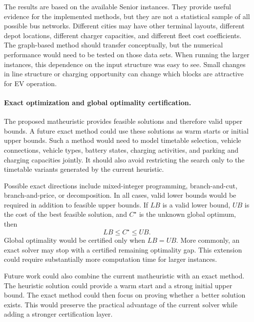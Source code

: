 The results are based on the available Senior instances.  They provide useful
evidence for the implemented methods, but they are not a statistical sample of
all possible bus networks.  Different cities may have other terminal layouts,
different depot locations, different charger capacities, and different fleet
cost coefficients.  The graph-based method should transfer conceptually, but
the numerical performance would need to be tested on those data sets.
When running the larger instances, this dependence on the input structure was
easy to see.  Small changes in line structure or charging opportunity can
change which blocks are attractive for EV operation.

\paragraph{Exact optimization and global optimality certification.}
\label{sec:future-global-optimality}

The proposed matheuristic provides feasible solutions and therefore valid upper
bounds.  A future exact method could use these solutions as warm starts or
initial upper bounds.  Such a method would need to model timetable selection,
vehicle connections, vehicle types, battery states, charging activities, and
parking and charging capacities jointly.  It should also avoid restricting the
search only to the timetable variants generated by the current heuristic.

Possible exact directions include mixed-integer programming, branch-and-cut,
branch-and-price, or decomposition.  In all cases, valid lower bounds would be
required in addition to feasible upper bounds.  If \(LB\) is a valid lower bound,
\(UB\) is the cost of the best feasible solution, and \(C^\star\) is the unknown
global optimum, then
\begin{equation}
  LB \le C^\star \le UB .
  \label{eq:future-bound-relation}
\end{equation}
Global optimality would be certified only when \(LB=UB\).  More commonly, an
exact solver may stop with a certified remaining optimality gap.  This extension
could require substantially more computation time for larger instances.

Future work could also combine the current matheuristic with an exact method.
The heuristic solution could provide a warm start and a strong initial upper
bound.  The exact method could then focus on proving whether a better solution
exists.  This would preserve the practical advantage of the current solver
while adding a stronger certification layer.

